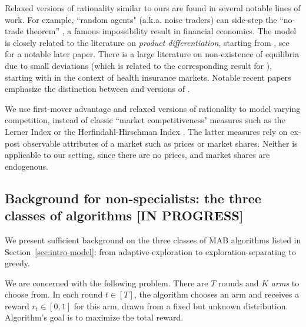 Relaxed versions of rationality similar to ours are found in several notable lines of work. For example, ``random agents" (a.k.a. noise traders) can side-step the ``no-trade theorem'' \citep{Milgrom-Stokey-82}, a famous impossibility result in financial economics. The \SoftMaxRandom model is closely related to the literature on \emph{product differentiation}, starting from \cite{Hotelling-29}, see \cite{Perloff-Salop-85} for a notable later paper. There is a large literature on non-existence of equilibria due to small deviations   (which is related to the corresponding result for \HardMaxRandom), starting with \cite{Rothschild-Stiglitz-76} in the context of health insurance markets. Notable recent papers \citep{Veiga-Weyl-16,Azevedo-Gottlieb-17} emphasize the distinction between \HardMax and versions of \SoftMaxRandom.

We use first-mover advantage and relaxed versions of rationality to model varying competition, instead of classic ``market competitiveness" measures such as the Lerner Index or the Herfindahl-Hirschman Index
\citep{tirole1988theory}. The latter measures rely on ex-post observable attributes of a market such as prices or market shares. Neither is applicable to our setting, since there are no prices, and market shares are endogenous.





\subsection{Background for non-specialists: the three classes of algorithms [IN PROGRESS]}
\label{sec:related-classes}

We present sufficient background on the three classes of MAB algorithms listed in Section~\ref{sec:intro-model}: from adaptive-exploration to exploration-separating to greedy.

We are concerned with the following problem. There are $T$ rounds and $K$ \emph{arms} to choose from. In each round $t\in [T]$, the algorithm chooses an arm and receives a reward $r_t\in[0,1]$ for this arm, drawn from a fixed but unknown distribution. Algorithm's goal is to maximize the total reward.

